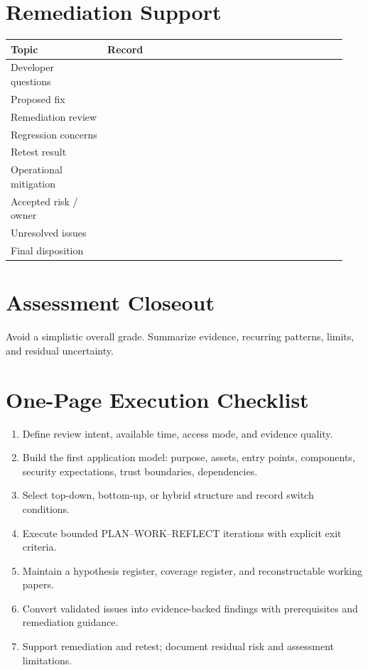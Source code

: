 \documentclass[10pt]{article}
\newcommand{\fieldline}[1]{\textbf{#1}\hspace{0.5em}\leaders\hbox{\rule[0.4ex]{0.6em}{0.35pt}\hspace{0.25em}}\hfill\kern0pt}
\newcommand{\workarea}[1]{\par\smallskip\noindent\begin{tcolorbox}[height=#1,colback=white,colframe=linegray,boxrule=0.5pt,arc=0pt,left=2pt,right=2pt,top=2pt,bottom=2pt]\mbox{}\end{tcolorbox}\par}
\begin{document}
\section{Remediation Support}
\begin{longtable}{@{}L{0.27\linewidth}L{0.67\linewidth}@{}}
\toprule
Topic & Record \\
\midrule
Developer questions & \\
Proposed fix & \\
Remediation review & \\
Regression concerns & \\
Retest result & \\
Operational mitigation & \\
Accepted risk / owner & \\
Unresolved issues & \\
Final disposition & \\
\bottomrule
\end{longtable}
\clearpage

\section{Assessment Closeout}
Avoid a simplistic overall grade. Summarize evidence, recurring patterns, limits, and residual uncertainty.
\clearpage

\section{One-Page Execution Checklist}
\begin{enumerate}
\item Define review intent, available time, access mode, and evidence quality.
\item Build the first application model: purpose, assets, entry points, components, security expectations, trust boundaries, dependencies.
\item Select top-down, bottom-up, or hybrid structure and record switch conditions.
\item Execute bounded PLAN--WORK--REFLECT iterations with explicit exit criteria.
\item Maintain a hypothesis register, coverage register, and reconstructable working papers.
\item Convert validated issues into evidence-backed findings with prerequisites and remediation guidance.
\item Support remediation and retest; document residual risk and assessment limitations.
\end{enumerate}
\end{document}
